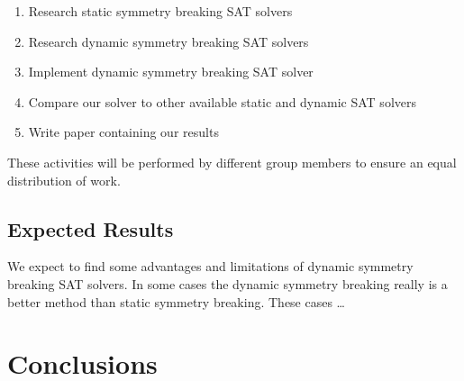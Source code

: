 			\begin{enumerate}
				\item Research static symmetry breaking SAT solvers
				\item Research dynamic symmetry breaking SAT solvers
				\item Implement dynamic symmetry breaking SAT solver
				\item Compare our solver to other available static and dynamic SAT solvers
				\item Write paper containing our results
			\end{enumerate}

			These activities will be performed by different group members to ensure an equal distribution of work.

		\subsection{Expected Results}
			We expect to find some advantages and limitations of dynamic symmetry breaking SAT solvers.
			In some cases the dynamic symmetry breaking really is a better method than static symmetry breaking. These cases \ldots

	\section{Conclusions}



